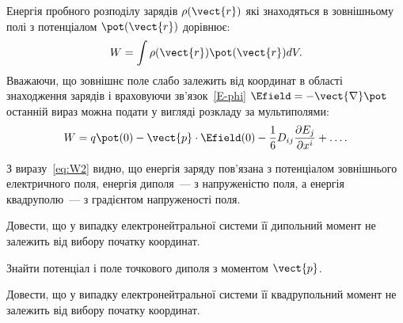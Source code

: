 \begin{Theory}
    Енергія пробного розподілу зарядів $\rho(\vect{r})$  які знаходяться в зовнішньому полі з потенціалом $\pot(\vect{r})$ дорівнює:
\begin{equation}\label{eq:W}
    W = \int \rho(\vect{r})\pot(\vect{r})dV.
\end{equation}
Вважаючи, що зовнішнє поле  слабо залежить від координат в області знаходження зарядів  і враховуючи зв'язок~\eqref{E-phi}  $\Efield = -\vect{\nabla}\pot$ останній вираз можна подати у вигляді розкладу за мультиполями:
\begin{equation}\label{eq:W2}
    W = q \pot(0)  -\vect{p}\cdot\Efield(0) - \frac16 D_{ij} \frac{\partial E_j}{\partial x^i} + \ldots.
\end{equation}

З виразу~\eqref{eq:W2} видно, що енергія заряду пов'язана  з потенціалом зовнішнього електричного поля, енергія диполя~--- з напруженістю поля, а енергія квадруполю~--- з градієнтом напруженості поля.

\end{Theory}

\begin{problem}
Довести, що у випадку електронейтральної системи її дипольний момент не залежить від вибору початку координат.
\end{problem}

\begin{problem}
Знайти потенціал і поле точкового диполя з моментом $\vect{p}$.
\end{problem}

\begin{problem}
Довести, що у випадку електронейтральної системи її квадрупольний момент не залежить від вибору початку координат.
\end{problem}

